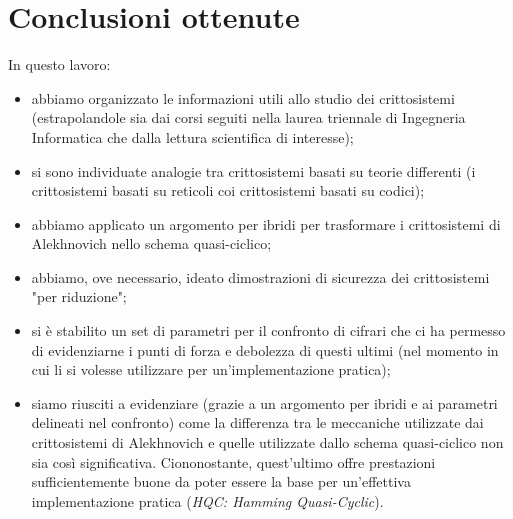 \documentclass[12pt, a4paper]{report}
\theoremstyle{definition}
\begin{document}
	\chapter{Conclusioni ottenute}
		In questo lavoro:
		\begin{itemize}
			\item abbiamo organizzato le informazioni utili allo studio dei crittosistemi (estrapolandole sia dai corsi seguiti nella laurea triennale di Ingegneria Informatica che dalla lettura scientifica di interesse);
			\item si sono individuate analogie tra crittosistemi basati su teorie differenti (i crittosistemi basati su reticoli coi crittosistemi basati su codici);
			\item abbiamo applicato un argomento per ibridi per trasformare i crittosistemi di Alekhnovich nello schema quasi-ciclico;
			\item abbiamo, ove necessario, ideato dimostrazioni di sicurezza dei crittosistemi "per riduzione";
			\item si è stabilito un set di parametri per il confronto di cifrari che ci ha permesso di evidenziarne i punti di forza e debolezza di questi ultimi (nel momento in cui li si volesse utilizzare per un'implementazione pratica);
			\item siamo riusciti a evidenziare (grazie a un argomento per ibridi e ai parametri delineati nel confronto) come la differenza tra le meccaniche utilizzate dai crittosistemi di Alekhnovich e quelle utilizzate dallo schema quasi-ciclico non sia così significativa. Ciononostante, quest'ultimo offre prestazioni sufficientemente buone da poter essere la base per un'effettiva implementazione pratica (\emph{HQC: Hamming Quasi-Cyclic}).
		\end{itemize}
\end{document}
